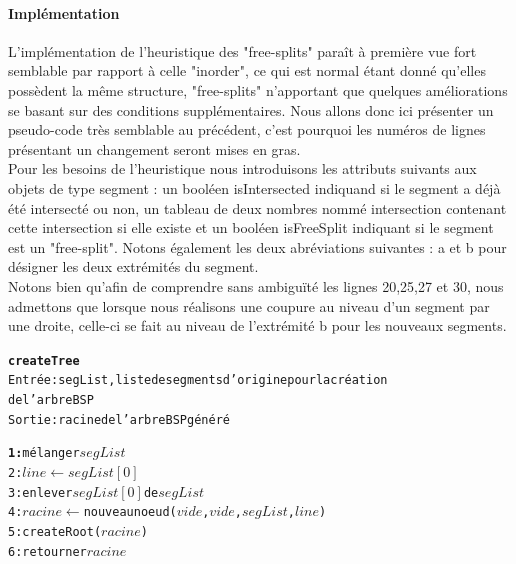 \documentclass[11pt,a4paper]{article}
\theoremstyle{definition}
\theoremstyle{remark}
\begin{document}
\paragraph{Implémentation}

L'implémentation de l'heuristique des "free-splits" paraît à première vue fort semblable par rapport à celle "inorder", ce qui est normal étant donné qu'elles possèdent la même structure, "free-splits" n'apportant que quelques améliorations se basant sur des conditions supplémentaires. Nous allons donc ici présenter un pseudo-code très semblable au précédent, c'est pourquoi les numéros de lignes présentant un changement seront mises en gras.\\

Pour les besoins de l'heuristique nous introduisons les attributs suivants aux objets de type segment : un booléen isIntersected indiquand si le segment a déjà été intersecté ou non, un tableau de deux nombres nommé intersection contenant cette intersection si elle existe et un booléen isFreeSplit indiquant si le segment est un "free-split". Notons également les deux abréviations suivantes : a et b pour désigner les deux extrémités du segment.\\

Notons bien qu'afin de comprendre sans ambiguïté les lignes 20,25,27 et 30, nous admettons que lorsque nous réalisons une coupure au niveau d'un segment par une droite, celle-ci se fait au niveau de l'extrémité b pour les nouveaux segments. 

\begin{alltt}
\textbf{createTree}
Entrée : segList, liste de segments d'origine pour la création 
de l'arbre BSP
Sortie : racine de l'arbre BSP généré

\textbf{1:} mélanger \(segList\)
2: \(line \leftarrow segList[0]\)
3: enlever \(segList[0]\) de \(segList\)
4: \(racine\) \(\leftarrow\) nouveau noeud (\(vide\), \(vide\), \(segList\), \(line\))
5: createRoot(\(racine\))
6: retourner \(racine\)
\end{alltt} 
\end{document}
